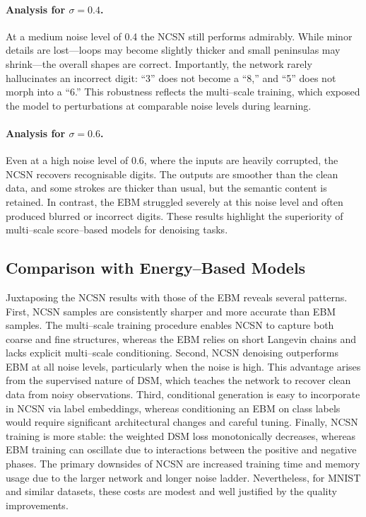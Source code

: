 \paragraph{Analysis for \texorpdfstring{$\sigma=0.4$}{sigma=0.4}.}
At a medium noise level of 0.4 the NCSN still performs admirably.  While
minor details are lost—loops may become slightly thicker and small
peninsulas may shrink—the overall shapes are correct.  Importantly, the
network rarely hallucinates an incorrect digit: ``3'' does not become a
``8,'' and ``5'' does not morph into a ``6.''  This robustness reflects
the multi–scale training, which exposed the model to perturbations at
comparable noise levels during learning.

\paragraph{Analysis for \texorpdfstring{$\sigma=0.6$}{sigma=0.6}.}
Even at a high noise level of 0.6, where the inputs are heavily
corrupted, the NCSN recovers recognisable digits.  The outputs are
smoother than the clean data, and some strokes are thicker than usual,
but the semantic content is retained.  In contrast, the EBM struggled
severely at this noise level and often produced blurred or incorrect
digits.  These results highlight the superiority of multi–scale
score–based models for denoising tasks.

\subsection{Comparison with Energy–Based Models}

Juxtaposing the NCSN results with those of the EBM reveals several
patterns.  First, NCSN samples are consistently sharper and more
accurate than EBM samples.  The multi–scale training procedure enables
NCSN to capture both coarse and fine structures, whereas the EBM
relies on short Langevin chains and lacks explicit multi–scale
conditioning.  Second, NCSN denoising outperforms EBM at all noise
levels, particularly when the noise is high.  This advantage arises from
the supervised nature of DSM, which teaches the network to recover clean
data from noisy observations.  Third, conditional generation is easy to
incorporate in NCSN via label embeddings, whereas conditioning an EBM on
class labels would require significant architectural changes and careful
tuning.  Finally, NCSN training is more stable: the weighted DSM loss
monotonically decreases, whereas EBM training can oscillate due to
interactions between the positive and negative phases.  The primary
downsides of NCSN are increased training time and memory usage due to the
larger network and longer noise ladder.  Nevertheless, for MNIST and
similar datasets, these costs are modest and well justified by the
quality improvements.

